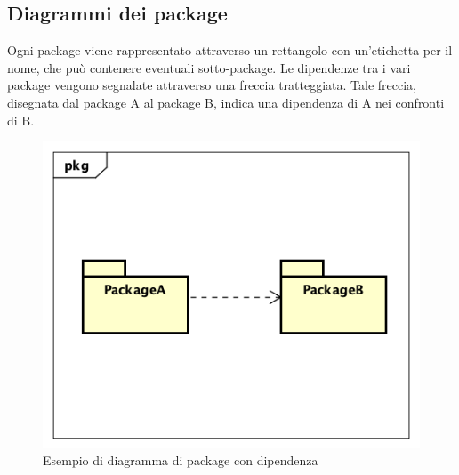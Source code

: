 \subsection{Diagrammi dei package}
\label{DiagrammiPackage}
Ogni package viene rappresentato attraverso un rettangolo con un'etichetta per il nome, che può contenere eventuali sotto-package. Le dipendenze tra i vari package vengono segnalate attraverso una freccia tratteggiata. Tale freccia, disegnata dal package A al package B, indica una dipendenza di A nei confronti di B.
\begin{figure}[h]
	\centering
	\includegraphics[scale=0.5]{images/DiagrammaPackage.png}
	\caption{Esempio di diagramma di package con dipendenza}\label{}
\end{figure}

